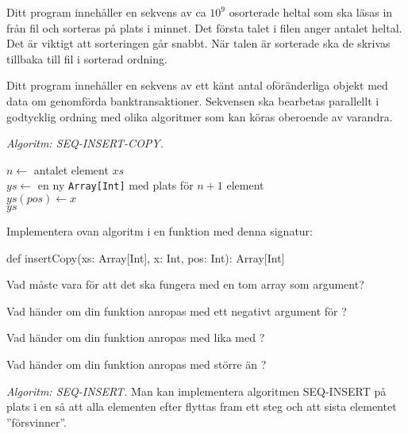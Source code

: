 \Subtask Ditt program innehåller en sekvens av ca $10^9$ osorterade heltal som ska läsas in från fil och sorteras på plats i minnet. Det första talet i filen anger antalet heltal. Det är viktigt att sorteringen går snabbt. När talen är sorterade ska de skrivas tillbaka till fil i sorterad ordning. 		
		
\Subtask Ditt program innehåller en sekvens av ett känt antal oföränderliga objekt med data om genomförda banktransaktioner. Sekvensen ska bearbetas parallellt i godtycklig ordning med olika algoritmer som kan köras oberoende av varandra.
 
\ExtraTasks %

\Task \emph{Algoritm: SEQ-INSERT-COPY.} 

\begin{algorithm}[H]
 
 $n \leftarrow$ antalet element $xs$\\ 
 $ys \leftarrow$ en ny \texttt{Array[Int]} med plats för $n+1$ element \\
 $ys(pos) \leftarrow x$ \\
 \Return $ys$ 
\end{algorithm}

\Subtask Implementera ovan algoritm i en funktion med denna signatur:
\begin{Code}
def insertCopy(xs: Array[Int], x: Int, pos: Int): Array[Int]
\end{Code}

\Subtask Vad måste  vara för att det ska fungera med en tom array som argument?

\Subtask Vad händer om din funktion anropas med ett negativt argument för ?

\Subtask Vad händer om din funktion anropas med  lika med ?

\Subtask Vad händer om din funktion anropas med  större än ?



\Task \emph{Algoritm: SEQ-INSERT.} Man kan implementera algoritmen SEQ-INSERT på plats i en  så att alla elementen efter  flyttas fram ett steg och att sista elementet ''försvinner''.

